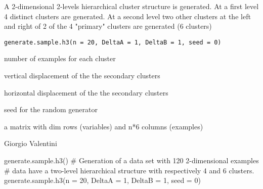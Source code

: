 \documentclass{article}
\begin{document}
\begin{Description}\relax
A 2-dimensional 2-levels hierarchical cluster structure is generated.
At a first level 4 distinct clusters  are generated.
At a second level two other clusters at the left and right of 2 of the 4 "primary" clusters are generated (6 clusters)
\end{Description}
\begin{Usage}
\begin{verbatim}
generate.sample.h3(n = 20, DeltaA = 1, DeltaB = 1, seed = 0)
\end{verbatim}
\end{Usage}
\begin{Arguments}
\begin{ldescription}
\item[\code{n}] number of examples for each cluster 
\item[\code{DeltaA}] vertical displacement of the the secondary clusters 
\item[\code{DeltaB}] horizontal displacement of the the secondary clusters 
\item[\code{seed}] seed for the random generator 
\end{ldescription}
\end{Arguments}
\begin{Value}
a matrix with dim rows (variables) and n*6 columns (examples)
\end{Value}
\begin{Author}\relax
Giorgio Valentini 
\end{Author}
\begin{Examples}
\begin{ExampleCode}
generate.sample.h3()
# Generation of a data set with 120 2-dimensional examples
# data have a two-level hierarchical structure with respectively 4 and 6 clusters. 
generate.sample.h3(n = 20, DeltaA = 1, DeltaB = 1, seed = 0)
\end{ExampleCode}
\end{Examples}
\end{document}
